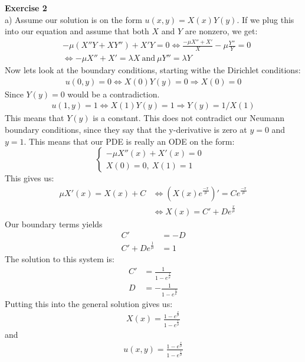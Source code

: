 \documentclass[11pt,a4paper]{report}
\begin{document}
\\
\\ 
\textbf{Exercise 2}
\\
a) Assume our solution is on the form $u(x,y)=X(x)Y(y)$. If we plug this into our equation and assume that both $X$ and $Y$ are nonzero, we get:
\begin{align*}
&-\mu(X''Y+XY'') + X'Y = 0 \iff \frac{- \mu X''+X'}{X} - \mu\frac{Y''}{Y}=0 \\
&\iff - \mu X''+X'=\lambda X \ \text{and} \ \mu Y'' = \lambda Y
\end{align*} 
Now lets look at the boundary conditions, starting withe the Dirichlet conditions:
\begin{align*}
u(0,y)=0 \iff X(0)Y(y)=0 \Rightarrow X(0)=0 
\end{align*}
Since $Y(y)=0$ would be a contradiction.
\begin{align*}
u(1,y)=1 \iff X(1)Y(y)=1 \Rightarrow Y(y)=1/X(1)
\end{align*} 
This means that $Y(y)$ is a constant. This does not contradict our Neumann boundary conditions, since they say that the y-derivative is zero at $y=0$ and $y=1$. This means that our PDE is really an ODE on the form:
\begin{displaymath}
   \left\{
     \begin{array}{lr}
       -\mu X''(x)+X'(x)= 0&   \\
       X(0)= 0, \ X(1)=1 &  
     \end{array}
   \right.
\end{displaymath}
This gives us: 
\begin{align}
\mu X'(x) = X(x) + C &\iff (X(x)e^{\frac{-x}{\mu}})'=Ce^{\frac{-x}{\mu}} \\
&\iff X(x) = C' + De^{\frac{x}{\mu}}
\end{align}
Our boundary terms yields
\begin{align*}
C'&=-D\\
C'+De^{\frac{1}{\mu}}&=1
\end{align*}
The solution to this system is:
\begin{align*}
C'&=\frac{1}{1-e^{\frac{1}{\mu}}} \\
D&=-\frac{1}{1-e^{\frac{1}{\mu}}}
\end{align*}
Putting this into the general solution gives us:
\begin{align*}
X(x)=\frac{1-e^{\frac{x}{\mu}}}{1-e^{\frac{1}{\mu}}}
\end{align*}
and 
\begin{align*}
u(x,y)=\frac{1-e^{\frac{x}{\mu}}}{1-e^{\frac{1}{\mu}}}
\end{align*}
\end{document}
